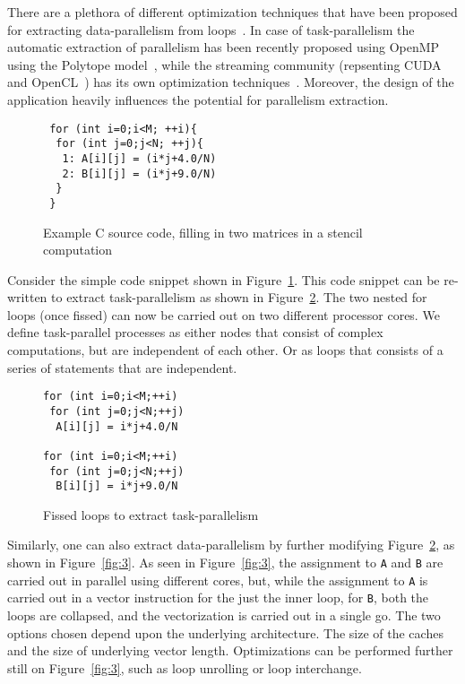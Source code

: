\documentclass[10pt, conference, compsocconf]{IEEEtran}
\begin{document}
There are a plethora of different optimization techniques that have been
proposed for extracting data-parallelism from
loops~\cite{smuc97,mgri98}. In case of task-parallelism the automatic
extraction of parallelism has been recently proposed using OpenMP using
the Polytope model~\cite{mgri98}, while the streaming community
(repsenting CUDA~\cite{jsan10} and OpenCL~\cite{opencl08}) has its own
optimization techniques~\cite{mgor06}. Moreover, the design of the
application heavily influences the potential for parallelism
extraction. 


\begin{figure}[h!]
  \centering
\begin{verbatim}
 for (int i=0;i<M; ++i){
  for (int j=0;j<N; ++j){
   1: A[i][j] = (i*j+4.0/N)
   2: B[i][j] = (i*j+9.0/N)
  }
 }
\end{verbatim}
  \caption{Example C source code, filling in two matrices in a stencil
    computation}
  \label{fig:1}
\end{figure}

Consider the simple code snippet shown in Figure~\ref{fig:1}. This code
snippet can be re-written to extract task-parallelism as shown in
Figure~\ref{fig:2}. The two nested for loops (once fissed) can now be
carried out on two different processor cores. We define task-parallel
processes as either nodes that consist of complex computations, but are
independent of each other. Or as loops that consists of a series of
statements that are independent.

\begin{figure}[h!]
  \centering
\begin{verbatim}
for (int i=0;i<M;++i)
 for (int j=0;j<N;++j)
  A[i][j] = i*j+4.0/N

for (int i=0;i<M;++i)
 for (int j=0;j<N;++j)
  B[i][j] = i*j+9.0/N
\end{verbatim}
  
  \caption{Fissed loops to extract task-parallelism}
  \label{fig:2}
\end{figure}

Similarly, one can also extract data-parallelism by further modifying
Figure~\ref{fig:2}, as shown in Figure~\ref{fig:3}. As seen in
Figure~\ref{fig:3}, the assignment to \texttt{A} and \texttt{B} are
carried out in parallel using different cores, but, while the assignment
to \texttt{A} is carried out in a vector instruction for the just the
inner loop, for \texttt{B}, both the loops are collapsed, and the
vectorization is carried out in a single go. The two options chosen
depend upon the underlying architecture. The size of the caches and the
size of underlying vector length. Optimizations can be performed further
still on Figure~\ref{fig:3}, such as loop unrolling or loop interchange.
\end{document}
